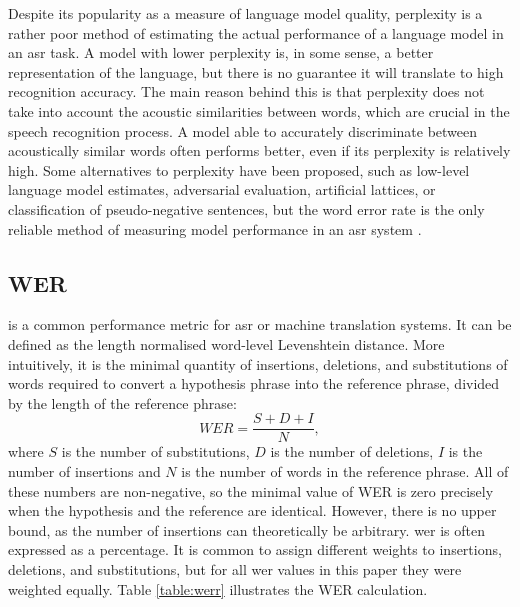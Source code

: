 	Despite its popularity as a measure of language model quality, perplexity is a rather poor method of estimating the actual performance of a language model in an \gls{asr} task. A model with lower perplexity is, in some sense, a better representation of the language, but there is no guarantee it will translate to high recognition accuracy. The main reason behind this is that perplexity does not take into account the acoustic similarities between words, which are crucial in the speech recognition process. A model able to accurately discriminate between acoustically similar words often performs better, even if its perplexity is relatively high. Some alternatives to perplexity have been proposed, such as low-level language model estimates, adversarial evaluation, artificial lattices, or classification of pseudo-negative sentences, but the word error rate is the only reliable method of measuring model performance in an \gls{asr} system \cite{pauls2012large}\cite{smith2012adversarial}.
	\subsection{WER}
	\label{subsection:wer}
	 is a common performance metric for \gls{asr} or machine translation systems. It can be defined as the length normalised \mbox{word-level} Levenshtein distance. More intuitively, it is the minimal quantity of insertions, deletions, and substitutions of words required to convert a hypothesis phrase into the reference phrase, divided by the length of the reference phrase:
	\begin{equation*}
		WER=\frac{S+D+I}{N},
	\end{equation*}
	where $S$ is the number of substitutions, $D$ is the number of deletions, $I$ is the number of insertions and $N$ is the number of words in the reference phrase. All of these numbers are non-negative, so the minimal value of WER is zero precisely when the hypothesis and the reference are identical. However, there is no upper bound, as the number of insertions can theoretically be arbitrary. \gls{wer} is often expressed as a percentage. It is common to assign different weights to insertions, deletions, and substitutions, but for all \gls{wer} values in this paper they were weighted equally. Table \ref{table:werr} illustrates the WER calculation. 

